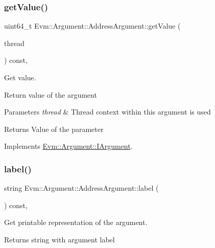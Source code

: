 \subsubsection{\texorpdfstring{get\+Value()}{getValue()}}
{\footnotesize\ttfamily uint64\+\_\+t Evm\+::\+Argument\+::\+Address\+Argument\+::get\+Value (\begin{DoxyParamCaption}\item[{\mbox{\hyperlink{struct_evm_1_1_thread_context}{Thread\+Context}} \&}]{thread }\end{DoxyParamCaption}) const\hspace{0.3cm}{\ttfamily [override]}, {\ttfamily [virtual]}}



Get value. 

Return value of the argument 
\begin{DoxyParams}{Parameters}
{\em thread} & Thread context within this argument is used \\
\hline
\end{DoxyParams}
\begin{DoxyReturn}{Returns}
Value of the parameter 
\end{DoxyReturn}


Implements \mbox{\hyperlink{struct_evm_1_1_argument_1_1_i_argument_af01db10f34498344831877847c2fc038}{Evm\+::\+Argument\+::\+I\+Argument}}.

\mbox{\label{struct_evm_1_1_argument_1_1_address_argument_a4a8ca0f63e6139140f924c2cab9b3d40}} 
\subsubsection{\texorpdfstring{label()}{label()}}
{\footnotesize\ttfamily string Evm\+::\+Argument\+::\+Address\+Argument\+::label (\begin{DoxyParamCaption}{ }\end{DoxyParamCaption}) const\hspace{0.3cm}{\ttfamily [override]}, {\ttfamily [virtual]}}



Get printable representation of the argument. 

\begin{DoxyReturn}{Returns}
string with argument label 
\end{DoxyReturn}


